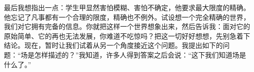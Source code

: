\begin{dialogue}
最后我想指出一点：学生甲显然害怕模糊、害怕不确定，他要求最大限度的精确。他忘记了凡事都有一个合理的限度，精确也不例外。试设想一个完全精确的世界，我们对它拥有完备的信息。你就把这样一个世界想象出来，然后告诉我：面对它的原始简单、它的再也无法发展，你难道不吃惊吗？把这一切好好想想，先别急着下结论。现在，暂时让我们试着从另一个角度接近这个问题。我提出如下的问题：“场是怎样描述的？”我知道，许多人得到答案之后会说：“这下我们知道场是什么了。”

\end{dialogue}

\cleardoublepage

